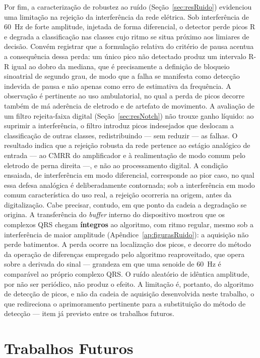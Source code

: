 Por fim, a caracterização de robustez ao ruído (Seção~\ref{sec:resRuido}) evidenciou uma limitação na rejeição da interferência da rede elétrica. Sob interferência de 60~Hz de forte amplitude, injetada de forma diferencial, o detector perde picos R e degrada a classificação nas classes cujo ritmo se situa próximo aos limiares de decisão. Convém registrar que a formulação relativa do critério de pausa acentua a consequência dessa perda: um único pico não detectado produz um intervalo R-R igual ao dobro da mediana, que é precisamente a definição de bloqueio sinoatrial de segundo grau, de modo que a falha se manifesta como detecção indevida de pausa e não apenas como erro de estimativa da frequência. A observação é pertinente ao uso ambulatorial, no qual a perda de picos decorre também de má aderência de eletrodo e de artefato de movimento. A avaliação de um filtro rejeita-faixa digital (Seção~\ref{sec:resNotch}) não trouxe ganho líquido: ao suprimir a interferência, o filtro introduz picos indesejados que deslocam a classificação de outras classes, redistribuindo — sem reduzir — as falhas. O resultado indica que a rejeição robusta da rede pertence ao estágio analógico de entrada — ao \acs{CMRR} do amplificador e à realimentação de modo comum pelo eletrodo de perna direita —, e não ao processamento digital. A condição ensaiada, de interferência em modo diferencial, corresponde ao pior caso, no qual essa defesa analógica é deliberadamente contornada; sob a interferência em modo comum característica do uso real, a rejeição ocorreria na origem, antes da digitalização. Cabe precisar, contudo, em que ponto da cadeia a degradação se origina. A transferência do \textit{buffer} interno do dispositivo mostrou que os complexos QRS chegam \textbf{íntegros} ao algoritmo, com ritmo regular, mesmo sob a interferência de maior amplitude (Apêndice~\ref{ap:figurasRuido}): a aquisição não perde batimentos. A perda ocorre na localização dos picos, e decorre do método da operação de diferenças empregado pelo algoritmo reaproveitado, que opera sobre a derivada do sinal --- grandeza em que uma senoide de 60~Hz é comparável ao próprio complexo QRS. O ruído aleatório de idêntica amplitude, por não ser periódico, não produz o efeito. A limitação é, portanto, do algoritmo de detecção de picos, e não da cadeia de aquisição desenvolvida neste trabalho, o que redireciona o aprimoramento pertinente para a substituição do método de detecção --- item já previsto entre os trabalhos futuros.


\section{Trabalhos Futuros}
\label{sec:c:futuros}


